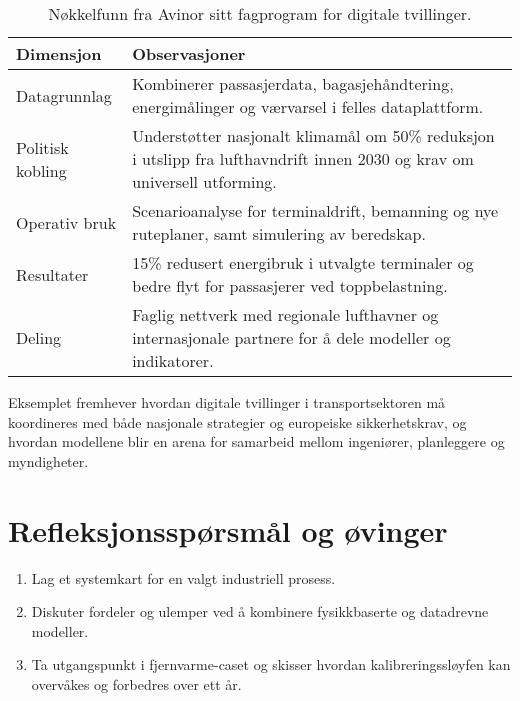 \begin{table}[ht]
    \centering
    \caption{Nøkkelfunn fra Avinor sitt fagprogram for digitale tvillinger.}
    \label{tab:kap02-avinor}
    \begin{tabular}{p{}p{}}
        \toprule
        \textbf{Dimensjon} & \textbf{Observasjoner} \\
        \midrule
        Datagrunnlag & Kombinerer passasjerdata, bagasjehåndtering, energimålinger og værvarsel i felles dataplattform. \\
        Politisk kobling & Understøtter nasjonalt klimamål om 50\% reduksjon i utslipp fra lufthavndrift innen 2030 og krav om universell utforming. \\
        Operativ bruk & Scenarioanalyse for terminaldrift, bemanning og nye ruteplaner, samt simulering av beredskap. \\
        Resultater & 15\% redusert energibruk i utvalgte terminaler og bedre flyt for passasjerer ved toppbelastning. \\
        Deling & Faglig nettverk med regionale lufthavner og internasjonale partnere for å dele modeller og indikatorer. \\
        \bottomrule
    \end{tabular}
\end{table}

Eksemplet fremhever hvordan digitale tvillinger i transportsektoren må koordineres med både nasjonale strategier og europeiske sikkerhetskrav, og hvordan modellene blir en arena for samarbeid mellom ingeniører, planleggere og myndigheter.

\section{Refleksjonsspørsmål og øvinger}
\begin{enumerate}
    \item Lag et systemkart for en valgt industriell prosess.
    \item Diskuter fordeler og ulemper ved å kombinere fysikkbaserte og datadrevne modeller.
    \item Ta utgangspunkt i fjernvarme-caset og skisser hvordan kalibreringssløyfen kan overvåkes og forbedres over ett år.
\end{enumerate}

